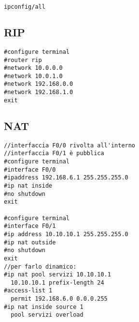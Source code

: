 \documentclass[a4paper, titlepage]{article}
\begin{document}
\begin{multicols}{2}
\begin{lstlisting}
ipconfig/all	
	\end{lstlisting}	
\subsection*{RIP}
	\begin{lstlisting}
#configure terminal
#router rip
#network 10.0.0.0
#network 10.0.1.0
#network 192.168.0.0
#network 192.168.1.0
exit
	\end{lstlisting}
\subsection*{NAT}
	\begin{lstlisting}
//interfaccia F0/0 rivolta all'interno
//interfaccia F0/1 è pubblica
#configure terminal
#interface F0/0
#ipaddress 192.168.6.1 255.255.255.0
#ip nat inside
#no shutdown
exit

#configure terminal
#interface F0/1
#ip address 10.10.10.1 255.255.255.0
#ip nat outside
#no shutdown
exit
//per farlo dinamico:
#ip nat pool servizi 10.10.10.1 
  10.10.10.1 prefix-length 24
#access-list 1 
  permit 192.168.6.0 0.0.0.255
#ip nat inside source 1 
  pool servizi overload
	\end{lstlisting}	

\end{multicols}
\end{document}
